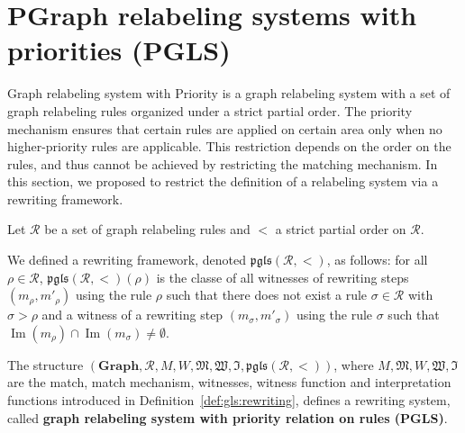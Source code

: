  \section{PGraph relabeling systems with priorities (PGLS)}
    Graph relabeling system with Priority is a graph relabeling system with a set of graph relabeling rules organized under a strict partial order. The priority mechanism ensures that certain rules are applied on certain area only when no higher-priority rules are applicable. This restriction depends on the order on the rules, and thus cannot be achieved by restricting the matching mechanism. In this section, we proposed to restrict the definition of a relabeling system via a rewriting framework.

 

    \begin{definition}
    \end{definition}
    
    \begin{definition}
      \label{def:pgls_framework}
    
      Let $\mathcal{R}$ be a set of graph relabeling rules and $<$ a strict partial order on $\mathcal{R}$.
    
      We defined a rewriting framework, denoted $\mathfrak{pgls}(\mathcal{R},<)$, as follows: for all $\rho \in \mathcal{R}$,
      $\mathfrak{pgls}(\mathcal{R},<)(\rho)$ is the classe of all witnesses of rewriting steps
      $\left(  m_\rho, m'_\rho \right)$ using the rule $\rho$
      such that there does not exist 
      a rule $\sigma \in \mathcal{R}$ with $\sigma > \rho$ and a witness of a rewriting step
      $\left(  m_\sigma, m'_\sigma \right)$ using the rule $\sigma$ such that 
      $\operatorname{Im}(m_\rho) \cap \operatorname{Im}(m_\sigma) \neq \emptyset$.
 
      The structure $(\mathbf{Graph},\mathcal{R},M,W,\mathfrak{M},\mathfrak{W},\mathfrak{I}, \mathfrak{pgls}(\mathcal{R},<))$, where $M, \mathfrak{M}, W , \mathfrak{W}, \mathfrak{I}$ are the match, match mechanism, witnesses, witness function and interpretation functions introduced in Definition~\ref{def:gls:rewriting}, defines a rewriting system, called \textbf{graph relabeling system with priority relation on rules (PGLS)}. 

    \end{definition}
     
